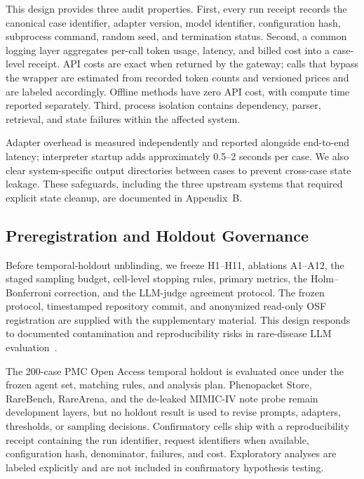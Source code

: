 \documentclass[letterpaper]{article} %
\begin{document}
This design provides three audit properties. First, every run receipt records the canonical case identifier, adapter version, model identifier, configuration hash, subprocess command, random seed, and termination status. Second, a common logging layer aggregates per-call token usage, latency, and billed cost into a case-level receipt. API costs are exact when returned by the gateway; calls that bypass the wrapper are estimated from recorded token counts and versioned prices and are labeled accordingly. Offline methods have zero API cost, with compute time reported separately. Third, process isolation contains dependency, parser, retrieval, and state failures within the affected system.

Adapter overhead is measured independently and reported alongside end-to-end latency; interpreter startup adds approximately 0.5--2 seconds per case. We also clear system-specific output directories between cases to prevent cross-case state leakage. These safeguards, including the three upstream systems that required explicit state cleanup, are documented in Appendix~B.

\subsection{Preregistration and Holdout Governance}
\label{sec-5-4}


Before temporal-holdout unblinding, we freeze H1--H11, ablations A1--A12, the staged sampling budget, cell-level stopping rules, primary metrics, the Holm--Bonferroni correction, and the LLM-judge agreement protocol. The frozen protocol, timestamped repository commit, and anonymized read-only OSF registration are supplied with the supplementary material. This design responds to documented contamination and reproducibility risks in rare-disease LLM evaluation~\cite{nguyen2026diagnostic}.

The 200-case PMC Open Access temporal holdout is evaluated once under the frozen agent set, matching rules, and analysis plan. Phenopacket Store, RareBench, RareArena, and the de-leaked MIMIC-IV note probe remain development layers, but no holdout result is used to revise prompts, adapters, thresholds, or sampling decisions. Confirmatory cells ship with a reproducibility receipt containing the run identifier, request identifiers when available, configuration hash, denominator, failures, and cost. Exploratory analyses are labeled explicitly and are not included in confirmatory hypothesis testing.
\end{document}
